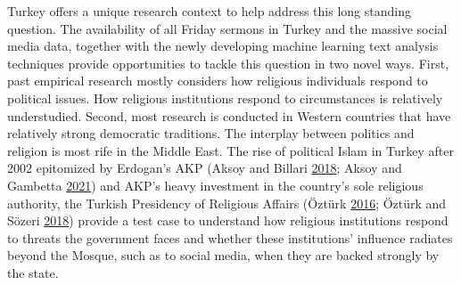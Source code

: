 \documentclass[
  12pt,
]{article}
\begin{document}
Turkey offers a unique research context to help address this long standing question. The availability of all Friday sermons in Turkey and the massive social media data, together with the newly developing machine learning text analysis techniques provide opportunities to tackle this question in two novel ways. First, past empirical research mostly considers how religious individuals respond to political issues. How religious institutions respond to circumstances is relatively understudied. Second, most research is conducted in Western countries that have relatively strong democratic traditions. The interplay between politics and religion is most rife in the Middle East. The rise of political Islam in Turkey after 2002 epitomized by Erdogan's AKP (Aksoy and Billari \protect\hyperlink{ref-aksoy2018political}{2018}; Aksoy and Gambetta \protect\hyperlink{ref-AG21}{2021}) and AKP's heavy investment in the country's sole religious authority, the Turkish Presidency of Religious Affairs (Öztürk \protect\hyperlink{ref-Ozt16}{2016}; Öztürk and Sözeri \protect\hyperlink{ref-uxf6ztuxfcrk_suxf6zeri_2018}{2018}) provide a test case to understand how religious institutions respond to threats the government faces and whether these institutions' influence radiates beyond the Mosque, such as to social media, when they are backed strongly by the state.
\end{document}
